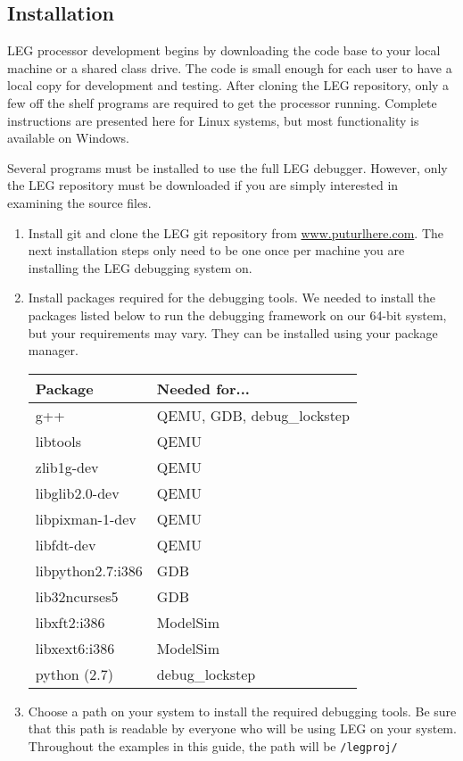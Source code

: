 \subsection{Installation}
LEG processor development begins by downloading the code base to your local machine or a shared class drive.
The code is small enough for each user to have a local copy for development and testing.
After cloning the LEG repository, only a few off the shelf programs are required to get the processor running.
Complete instructions are presented here for Linux systems, but most functionality is available on Windows.

Several programs must be installed to use the full LEG debugger. 
However, only the LEG repository must be downloaded if you are simply interested in examining the source files.

\begin{enumerate}
\item Install git and clone the LEG git repository from \url{www.puturlhere.com}. 
The next installation steps only need to be one once per machine you are installing the LEG debugging system on.

\item Install packages required for the debugging tools. We needed to install the packages listed below to run the debugging framework on our 64-bit system, but your requirements may vary.
They can be installed using your package manager.

\begin{tabular}{|l|l|}
\hline 
\textbf{Package} & \textbf{Needed for...} \\\hline
g++ & QEMU, GDB, debug\_lockstep \\\hline
libtools & QEMU \\\hline
zlib1g-dev & QEMU \\\hline
libglib2.0-dev & QEMU \\\hline
libpixman-1-dev & QEMU \\\hline
libfdt-dev & QEMU \\\hline
libpython2.7:i386 & GDB \\\hline
lib32ncurses5 & GDB \\\hline
libxft2:i386 & ModelSim \\\hline
libxext6:i386 & ModelSim \\\hline
python (2.7)& debug\_lockstep \\\hline
\end{tabular}

\item Choose a path on your system to install the required debugging tools. 
Be sure that this path is readable by everyone who will be using LEG on your system.
Throughout the examples in this guide, the path will be \texttt{/legproj/}


\end{enumerate}
